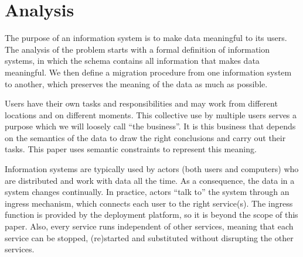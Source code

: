 \documentclass{elsarticle}
\begin{document}
\section{Analysis}
\label{sct:Analysis}
   The purpose of an information system is to make data meaningful to its users.
   The analysis of the problem starts with a formal definition of information systems,
   in which the schema contains all information that makes data meaningful.
   We then define a migration procedure from one information system to another,
   which preserves the meaning of the data as much as possible.

   Users have their own tasks and responsibilities
   and may work from different locations and on different moments.
   This collective use by multiple users serves a purpose which we will loosely call ``the business''.
   It is this business that depends on the semantics of the data to draw the right conclusions and carry out their tasks.
   This paper uses semantic constraints to represent this meaning.
   
   Information systems are typically used by actors (both users and computers) who are distributed and work with data all the time.
   As a consequence, the data in a system changes continually.
   In practice, actors ``talk to'' the system through an ingress mechanism, which connects each user to the right service(s).
   The ingress function is provided by the deployment platform, so it is beyond the scope of this paper.
   Also, every service runs independent of other services,
   meaning that each service can be stopped, (re)started and substituted without disrupting the other services.
\end{document}
